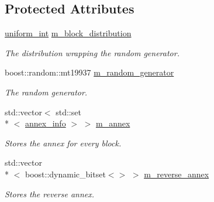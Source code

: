 \subsection*{Protected Attributes}
\begin{DoxyCompactItemize}
\item 
\hypertarget{classkodo_1_1random__annex__base_a2590b643a969943744f10b681d6a8e91}{\hyperlink{classkodo_1_1random__annex__base_ab35772eb5e7d4dbd74fbdea0c7bb04c7}{uniform\-\_\-int} \hyperlink{classkodo_1_1random__annex__base_a2590b643a969943744f10b681d6a8e91}{m\-\_\-block\-\_\-distribution}}\label{classkodo_1_1random__annex__base_a2590b643a969943744f10b681d6a8e91}

\begin{DoxyCompactList}\small\item\em The distribution wrapping the random generator. \end{DoxyCompactList}\item 
\hypertarget{classkodo_1_1random__annex__base_a661488fd30cb07fb9cfb48b98db15dee}{boost\-::random\-::mt19937 \hyperlink{classkodo_1_1random__annex__base_a661488fd30cb07fb9cfb48b98db15dee}{m\-\_\-random\-\_\-generator}}\label{classkodo_1_1random__annex__base_a661488fd30cb07fb9cfb48b98db15dee}

\begin{DoxyCompactList}\small\item\em The random generator. \end{DoxyCompactList}\item 
\hypertarget{classkodo_1_1random__annex__base_a03b1dd1da1eb7423f405c5846b713438}{std\-::vector$<$ std\-::set\\*
$<$ \hyperlink{structkodo_1_1annex__info}{annex\-\_\-info} $>$ $>$ \hyperlink{classkodo_1_1random__annex__base_a03b1dd1da1eb7423f405c5846b713438}{m\-\_\-annex}}\label{classkodo_1_1random__annex__base_a03b1dd1da1eb7423f405c5846b713438}

\begin{DoxyCompactList}\small\item\em Stores the annex for every block. \end{DoxyCompactList}\item 
\hypertarget{classkodo_1_1random__annex__base_ab76b16b50935419ac6b948ec787901fe}{std\-::vector\\*
$<$ boost\-::dynamic\-\_\-bitset$<$$>$ $>$ \hyperlink{classkodo_1_1random__annex__base_ab76b16b50935419ac6b948ec787901fe}{m\-\_\-reverse\-\_\-annex}}\label{classkodo_1_1random__annex__base_ab76b16b50935419ac6b948ec787901fe}

\begin{DoxyCompactList}\small\item\em Stores the reverse annex. \end{DoxyCompactList}\end{DoxyCompactItemize}



